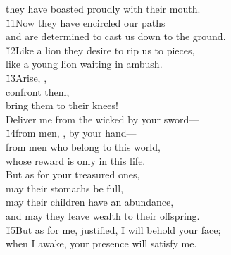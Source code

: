 \begin{poetry}
\poemll    they have boasted proudly with their mouth. \\
\poeml \v{11}Now they have encircled our paths \\
\poemll    and are determined to cast us down to the ground. \\
\poeml \v{12}Like a lion they desire to rip us to pieces, \\
\poemll    like a young lion waiting in ambush. \\
\poeml \v{13}Arise, , \\
\poemll    confront them, \\
\poemlll       bring them to their knees! \\
\poeml Deliver me from the wicked by your sword--- \\
\poeml \v{14}from men, , by your hand--- \\
\poeml from men who belong to this world, \\
\poemll    whose reward is only in this life. \\
\poeml But as for your treasured ones, \\
\poemll    may their stomachs be full, \\
\poeml may their children have an abundance, \\
\poemll    and may they leave wealth to their offspring. \\
\poeml \v{15}But as for me, justified, I will behold your face; \\
\poemll    when I awake, your presence will satisfy me.
\end{poetry}

